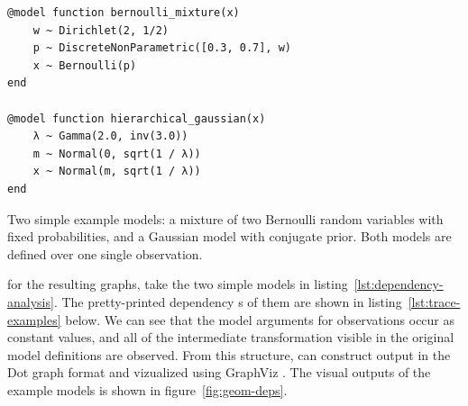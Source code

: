 \begin{lstfloat}[p]
\begin{lstlisting}[style=lstfloat]
@model function bernoulli_mixture(x)
    w ~ Dirichlet(2, 1/2)
    p ~ DiscreteNonParametric([0.3, 0.7], w)
    x ~ Bernoulli(p)
end

@model function hierarchical_gaussian(x)
    λ ~ Gamma(2.0, inv(3.0))
    m ~ Normal(0, sqrt(1 / λ))
    x ~ Normal(m, sqrt(1 / λ))
end
\end{lstlisting}
  \caption{Two simple example models: a mixture of two Bernoulli random variables with fixed
    probabilities, and a Gaussian model with conjugate prior.  Both models are defined over one
    single observation.}
  \label{lst:dependency-examples}
\end{lstfloat}

 for the resulting graphs, take the two simple models in
listing~\ref{lst:dependency-analysis}.  The pretty-printed dependency s of them are
shown in listing~\ref{lst:trace-examples} below.  We can see that the model arguments for
observations occur as constant values, and all of the intermediate transformation visible in the
original model definitions are observed.  From this structure, \autogibbsjl{} can construct output
in the Dot graph format and vizualized using GraphViz \parencite{gansner2000open}.  The visual
outputs of the example models is shown in figure~\ref{fig:geom-deps}.

